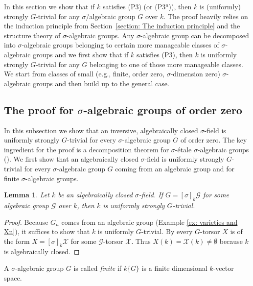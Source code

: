 \documentclass[oneside,reqno]{amsart}
\newtheorem{lemma}[theo]{Lemma}
\newtheorem{prop}[theo]{Proposition}
\theoremstyle{definition}
\newcommand{\G}{\mathcal{G}}
\newcommand{\X}{\mathcal{X}}
\newcommand{\s}{\sigma}
\newcommand{\po}{{\rm{(P1$^u$)}}}
\newcommand{\pt}{{\rm{(P3$^u$)}}}
\newcommand{\poweak}{{\rm{(P1)}}}
\newcommand{\ptweak}{{\rm{(P3)}}}
\begin{document}
In this section we show that if $k$ satisfies \ptweak{} (or \pt{}), then $k$ is (uniformly) strongly $G$-trivial for any $\s$\=/algebraic group $G$ over $k$. %
The proof heavily relies on the induction principle from Section~\ref{section: The induction principle} and the structure theory of $\s$-algebraic groups. Any $\s$-algebraic group can be decomposed into $\s$-algebraic groups belonging to certain more manageable classes of $\s$-algebraic groups and we first show that if $k$ satisfies \ptweak{}, then $k$ is uniformly strongly $G$-trivial for any $G$ belonging to one of those more manageable classes. We start from classes of small (e.g., finite, order zero, $\s$-dimension zero) $\s$-algebraic groups and then build up to the general case. 

\subsection{The proof for $\s$-algebraic groups of order zero} \label{section: order zero}

In this subsection we show that an inversive, algebraically closed $\s$-field is uniformly strongly $G$-trivial for every $\s$-algebraic group $G$ of order zero. The key ingredient for the proof is a decomposition theorem for $\s$-\'{e}tale $\s$-algebraic groups (\cite[Theorem 6.38]{Wibmer:etale}). 
We first show that an algebraically closed $\s$-field is uniformly strongly $G$-trivial for every $\s$-algebraic group $G$ coming from an algebraic group and for finite $\s$-algebraic groups.

\begin{lemma} \label{lemma: algebraic case}
	Let $k$ be an algebraically closed $\s$-field.
	 If $G=[\s]_k\G$ for some algebraic group $\G$ over $k$, then $k$ is uniformly strongly $G$-trivial.
\end{lemma}
\begin{proof}
	Because $G_n$ comes from an algebraic group (Example \ref{ex: varieties and Xn}), it suffices to show that $k$ is uniformly $G$-trivial. 
By \cite[Cor. 3.3]{BachmayrWibmer:TorsorsForDifferenceAlgebraicGroups} every $G$-torsor $X$ is of the form $X=[\s]_k\X$ for some $\G$-torsor $\X$. Thus $X(k)=\X(k)\neq\emptyset$ because $k$ is algebraically closed.
\end{proof}
A $\s$-algebraic group $G$ is called \emph{finite} if $k\{G\}$ is a finite dimensional $k$-vector space.
 
\end{document}
